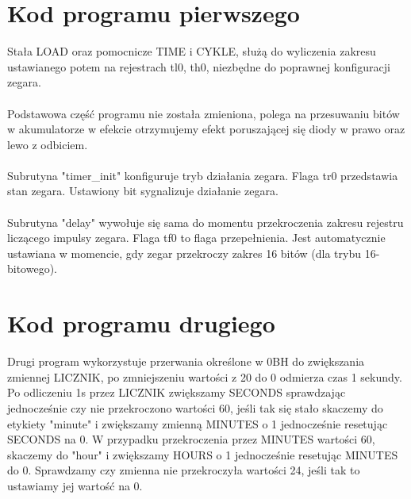 \documentclass[12pt,a4paper]{article}
\begin{document}
	\section{Kod programu pierwszego}
		\begin{minipage}{.5\textwidth}
			
		\end{minipage}%
		\begin{minipage}{.5\textwidth}
			Stała LOAD oraz pomocnicze TIME i CYKLE, służą do wyliczenia zakresu ustawianego potem na rejestrach tl0, th0,
			niezbędne do poprawnej konfiguracji zegara.\\\\
			Podstawowa część programu nie została zmieniona, polega na przesuwaniu bitów w akumulatorze w efekcie otrzymujemy efekt
			poruszającej się diody w prawo oraz lewo z odbiciem.\\\\
			Subrutyna "timer\_init" konfiguruje tryb działania zegara. Flaga tr0 przedstawia stan zegara. Ustawiony bit sygnalizuje działanie zegara. \\\\
			Subrutyna "delay" wywołuje się sama do momentu przekroczenia zakresu rejestru liczącego impulsy zegara. Flaga tf0 to flaga przepełnienia. Jest automatycznie ustawiana w momencie, gdy zegar przekroczy zakres 16 bitów (dla trybu 16-bitowego).
		\end{minipage}
	
	\section{Kod programu drugiego}
		\begin{minipage}{.5\textwidth}
			
		\end{minipage}%
		\begin{minipage}{.5\textwidth}
			Drugi program wykorzystuje przerwania określone w 0BH do zwiększania zmiennej LICZNIK, po zmniejszeniu wartości z 20 do 0 odmierza czas 1 sekundy. Po odliczeniu 1s przez LICZNIK zwiększamy SECONDS
			sprawdzając jednocześnie czy nie przekroczono wartości 60, jeśli tak się stało skaczemy do etykiety "minute" i zwiększamy zmienną MINUTES o 1 jednocześnie resetując SECONDS na 0. W przypadku przekroczenia przez MINUTES wartości 60, skaczemy do "hour" i zwiększamy HOURS o 1 jednocześnie resetując MINUTES do 0.
			Sprawdzamy czy zmienna nie przekroczyła wartości 24, jeśli tak to ustawiamy jej wartość na 0.\\\\
		\end{minipage}
		
\end{document}
